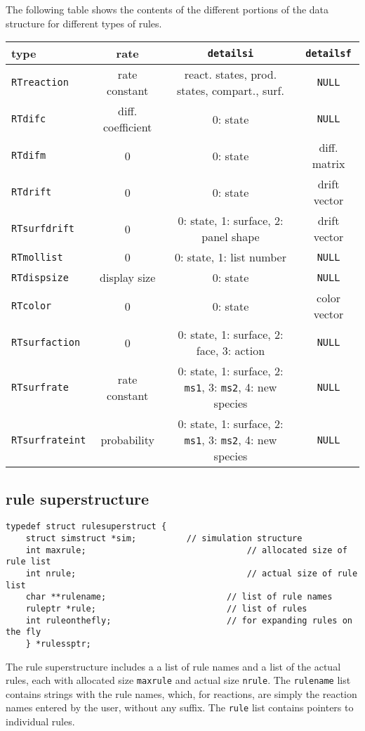 \documentclass {book}
\begin{document}
The following table shows the contents of the different portions of the data structure for different types of rules.

\begin{longtable}[c]{lccc}
type&rate&\texttt{detailsi}&\texttt{detailsf}\\
\hline
\texttt{RTreaction}&rate constant&react. states, prod. states, compart., surf.&\texttt{NULL}\\
\texttt{RTdifc}&diff. coefficient&0: state&\texttt{NULL}\\
\texttt{RTdifm}&0&0: state&diff. matrix\\
\texttt{RTdrift}&0&0: state&drift vector\\
\texttt{RTsurfdrift}&0&0: state, 1: surface, 2: panel shape&drift vector\\
\texttt{RTmollist}&0&0: state, 1: list number&\texttt{NULL}\\
\texttt{RTdispsize}&display size&0: state&\texttt{NULL}\\
\texttt{RTcolor}&0&0: state&color vector\\
\texttt{RTsurfaction}&0&0: state, 1: surface, 2: face, 3: action&\texttt{NULL}\\
\texttt{RTsurfrate}&rate constant&0: state, 1: surface, 2: \texttt{ms1}, 3: \texttt{ms2}, 4: new species&\texttt{NULL}\\
\texttt{RTsurfrateint}&probability&0: state, 1: surface, 2: \texttt{ms1}, 3: \texttt{ms2}, 4: new species&\texttt{NULL}\\

\end{longtable}


\subsection*{rule superstructure}

\begin{lstlisting}
typedef struct rulesuperstruct {
	struct simstruct *sim;			// simulation structure
	int maxrule;								// allocated size of rule list
	int nrule;									// actual size of rule list
	char **rulename;						// list of rule names
	ruleptr *rule;							// list of rules
	int ruleonthefly;						// for expanding rules on the fly
	} *rulessptr;
\end{lstlisting}

The rule superstructure includes a a list of rule names and a list of the actual rules, each with allocated size \texttt{maxrule} and actual size \texttt{nrule}.  The \texttt{rulename} list contains strings with the rule names, which, for reactions, are simply the reaction names entered by the user, without any suffix.  The \texttt{rule} list contains pointers to individual rules.
\end{document}
